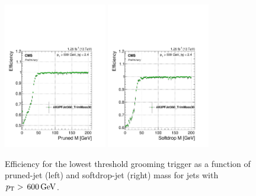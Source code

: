 \begin{figure}[htb]
\centering
\includegraphics[width=0.4\textwidth]{figures/analysis/search1/AN-15-211//triggereff-prunedmass600.pdf}
\includegraphics[width=0.4\textwidth]{figures/analysis/search1/AN-15-211//triggereff-sdmass.pdf}
\caption{Efficiency for the lowest threshold grooming trigger as a function of pruned-jet (left) and softdrop-jet (right) mass for jets with $p_{\mathrm{T}} > \text{\,600}{\ensuremath{\,\text{Ge\hspace{-.08em}V}}}$.}
\label{fig:searchI:grooming-mj-trigger}
\end{figure}





